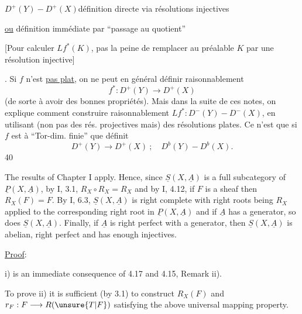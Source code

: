 $D^+(Y)\mathbin{-}D^+(X)$\qquad définition directe via résolutions injectives

\uline{ou} définition immédiate par ``passage au quotient''

[Pour calculer $Lf^*(K)$, pas la peine de remplacer au préalable $K$ par une résolution injective]

. Si $f$ n'est \uline{pas plat}, on  ne peut en général définir raisonnablement
\[
f^*:D^+(Y)\longrightarrow D^+(X)
\]
(de sorte à avoir des bonnes propriétés). Mais dans la suite de ces notes, on explique comment construire raisonnablement $Lf^*:D^-(Y)\mathbin{-}D^-(X)$,  en utilisant (non pas des rés. projectives mais) des résolutions plates. Ce n'est que si $f$ est à ``Tor-dim. finie'' que  définit
\[
D^+(Y)\longrightarrow D^+(X)\ ;\quad D^b(Y)\mathbin{-}D^b(X).
\]
\hfill 40

The results of Chapter I apply. Hence, since $\underline S(X,\underline A)$ is a full subcategory of $\underline P(X,\underline A)$, by I, 3.1, $R_X\circ R_X=R_X$ and by I, 4.12, if $F$ is a sheaf then $R_X(F)=F$. By I, 6.3, $\underline S(X,\underline A)$ is right complete with right roots being $R_X$ applied to the corresponding right root in $\underline P(X,\underline A)$ and if $\underline A$ has a generator, so does $\underline S(X,\underline A)$. Finally, if $\underline A$ is right perfect with a generator, then $\underline S(X,\underline A)$ is abelian, right perfect and has enough injectives.

\uline{Proof}:

i) is an immediate consequence of 4.17 and 4.15, Remark ii).

To prove ii) it is sufficient (by 3.1) to construct $R_X(F)$ and $r_F:F\longrightarrow R(\unsure{T|F})$ satisfying the above universal mapping property.

